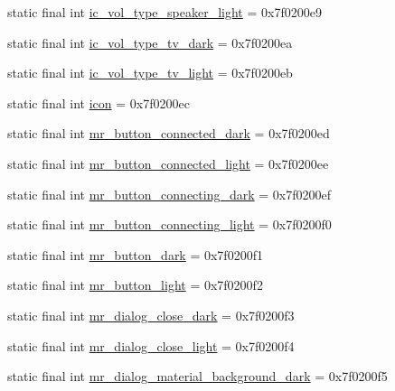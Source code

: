 \begin{CompactItemize}
\item 
static final int \hyperlink{classandroid_1_1support_1_1v7_1_1cardview_1_1_r_1_1drawable_5f8b4fa58a78551fceb1abf4a0e0c78a}{ic\_\-vol\_\-type\_\-speaker\_\-light} = 0x7f0200e9
\item 
static final int \hyperlink{classandroid_1_1support_1_1v7_1_1cardview_1_1_r_1_1drawable_c21dc43b5ac363bda2ef29f07f803d81}{ic\_\-vol\_\-type\_\-tv\_\-dark} = 0x7f0200ea
\item 
static final int \hyperlink{classandroid_1_1support_1_1v7_1_1cardview_1_1_r_1_1drawable_6f26d32959da85eac31da3ef2cc5a3ef}{ic\_\-vol\_\-type\_\-tv\_\-light} = 0x7f0200eb
\item 
static final int \hyperlink{classandroid_1_1support_1_1v7_1_1cardview_1_1_r_1_1drawable_9c6ad34a9a64e8ddb2d4bd0702b10056}{icon} = 0x7f0200ec
\item 
static final int \hyperlink{classandroid_1_1support_1_1v7_1_1cardview_1_1_r_1_1drawable_bc2e2989faf27b8ba32674d74b0dc27a}{mr\_\-button\_\-connected\_\-dark} = 0x7f0200ed
\item 
static final int \hyperlink{classandroid_1_1support_1_1v7_1_1cardview_1_1_r_1_1drawable_32007ba30dd6b6c5926ca95a58b089c8}{mr\_\-button\_\-connected\_\-light} = 0x7f0200ee
\item 
static final int \hyperlink{classandroid_1_1support_1_1v7_1_1cardview_1_1_r_1_1drawable_81144c340678a70bf1ed6329f1c4f370}{mr\_\-button\_\-connecting\_\-dark} = 0x7f0200ef
\item 
static final int \hyperlink{classandroid_1_1support_1_1v7_1_1cardview_1_1_r_1_1drawable_66aab9d267f8db63b26356450b16130c}{mr\_\-button\_\-connecting\_\-light} = 0x7f0200f0
\item 
static final int \hyperlink{classandroid_1_1support_1_1v7_1_1cardview_1_1_r_1_1drawable_255d4908c1bffa4dc7f6ec46d5703ef2}{mr\_\-button\_\-dark} = 0x7f0200f1
\item 
static final int \hyperlink{classandroid_1_1support_1_1v7_1_1cardview_1_1_r_1_1drawable_0aa2c86ba64e6fae24b2004ef5df1321}{mr\_\-button\_\-light} = 0x7f0200f2
\item 
static final int \hyperlink{classandroid_1_1support_1_1v7_1_1cardview_1_1_r_1_1drawable_99ac2b6cc6d9a20679047cb0dd1691c2}{mr\_\-dialog\_\-close\_\-dark} = 0x7f0200f3
\item 
static final int \hyperlink{classandroid_1_1support_1_1v7_1_1cardview_1_1_r_1_1drawable_08bb2b64e1580fa4f1e61a081e89def2}{mr\_\-dialog\_\-close\_\-light} = 0x7f0200f4
\item 
static final int \hyperlink{classandroid_1_1support_1_1v7_1_1cardview_1_1_r_1_1drawable_58ded6aa08882e53d75c0a7e2da86873}{mr\_\-dialog\_\-material\_\-background\_\-dark} = 0x7f0200f5

\end{CompactItemize}

